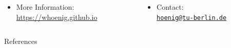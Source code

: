 \documentclass[aspectratio=169,xcolor={svgnames}]{beamer}
\begin{document}
  \begin{frame}[standout]
    \inserttitle

    \begin{center}
    \end{center}

    \begin{columns}
      \begin{column}{0.55\textwidth}
        \begin{itemize}
        \item More Information:\\\url{https://whoenig.github.io}
        \end{itemize}
      \end{column}
      \begin{column}{0.45\textwidth}
        \begin{itemize}
        \item Contact:\\\href{mailto:hoenig@tu-berlin.de}{\texttt{hoenig@tu-berlin.de}}%
        \end{itemize}
      \end{column}
    \end{columns}
  \end{frame}

  \begin{frame}[allowframebreaks]{References}
    \printbibliography[heading=none]
  \end{frame}
\end{document}
